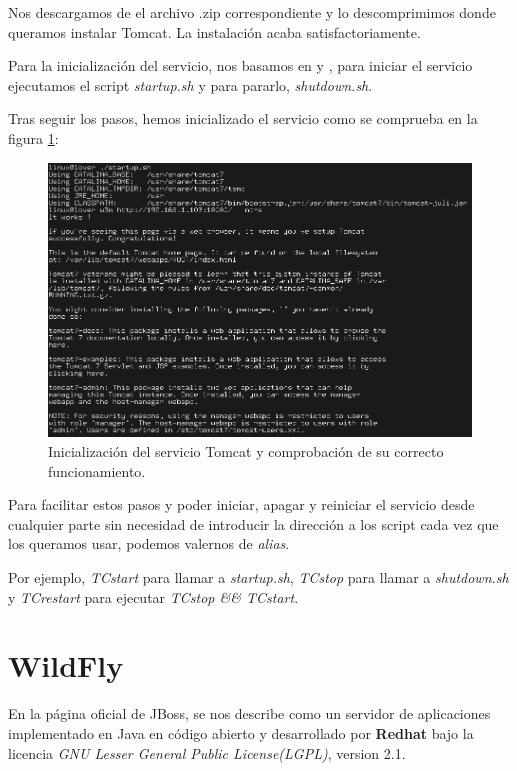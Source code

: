 \documentclass[a4paper, 10pt]{article}
\begin{document}
		Nos descargamos de \cite{TC_download} el archivo .zip correspondiente y lo descomprimimos
		donde queramos instalar Tomcat. La instalación acaba satisfactoriamente.
		
		Para la inicialización del servicio, nos basamos en \cite{TC_install} y \cite{TC_config},
		para iniciar el servicio ejecutamos el script \textit{startup.sh} y para pararlo,
		\textit{shutdown.sh}.
		
		Tras seguir los pasos, hemos inicializado el servicio como se comprueba en la figura
		\ref{fig:TC_Success}:
		
		\begin{figure}[h!]
			\includegraphics[width=15cm]{Success_TC.png}
			\caption{Inicialización del servicio Tomcat y comprobación de su correcto funcionamiento.}
			\label{fig:TC_Success}
		\end{figure}

		Para facilitar estos pasos y poder iniciar, apagar y reiniciar el servicio desde cualquier
		parte sin necesidad de introducir la dirección a los script cada vez que los queramos usar,
		podemos valernos de \textit{alias}.
		
		Por ejemplo, \textit{TCstart} para llamar a \textit{startup.sh}, \textit{TCstop} para llamar
		a \textit{shutdown.sh} y \textit{TCrestart} para ejecutar \textit{TCstop \&\& TCstart}.
	
\section{WildFly}
	En la página oficial de JBoss\cite{WF_official}, se nos describe como un servidor de aplicaciones
	implementado en Java en código abierto y desarrollado por \textbf{Redhat} bajo la licencia
	\textit{GNU Lesser General Public License(LGPL)}, version 2.1.
	
\end{document}
